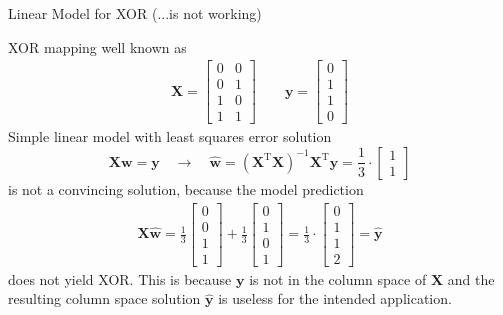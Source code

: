 \documentclass[mathserif, aspectratio=1610]{intbeamer}
\begin{document}
\begin{frame}[t]{Linear Model for XOR (...is not working)}

XOR mapping well known as
\begin{align*}
\bm{X} =
\begin{bmatrix}
0 & 0\\
0 & 1\\
1 & 0\\
1 & 1
\end{bmatrix}\qquad
\bm{y} =
\begin{bmatrix}
0\\
1\\
1\\
0
\end{bmatrix}
\end{align*}
Simple linear model with least squares error solution
$$\bm{X} \bm{w} = \bm{y} \quad\rightarrow\quad \hat{\bm{w}} = (\bm{X}^\mathrm{T} \bm{X})^{-1} \bm{X}^\mathrm{T} \bm{y}
=
\frac{1}{3}\cdot
\begin{bmatrix}
1\\
1
\end{bmatrix}
$$
is not a convincing solution, because the model prediction
\begin{align*}
\bm{X} \hat{\bm{w}} =
\frac{1}{3}
\begin{bmatrix}
0\\
0\\
1\\
1
\end{bmatrix}
+
\frac{1}{3}
\begin{bmatrix}
0\\
1\\
0\\
1
\end{bmatrix}
=
\frac{1}{3}\cdot
\begin{bmatrix}
0\\
1\\
1\\
2
\end{bmatrix}
=\hat{\bm{y}}
\end{align*}
does not yield XOR. This is because $\bm{y}$ is not in the column space of $\bm{X}$ and
the resulting column space solution $\hat{\bm{y}}$
is useless for the intended application.

\end{frame}
\end{document}
